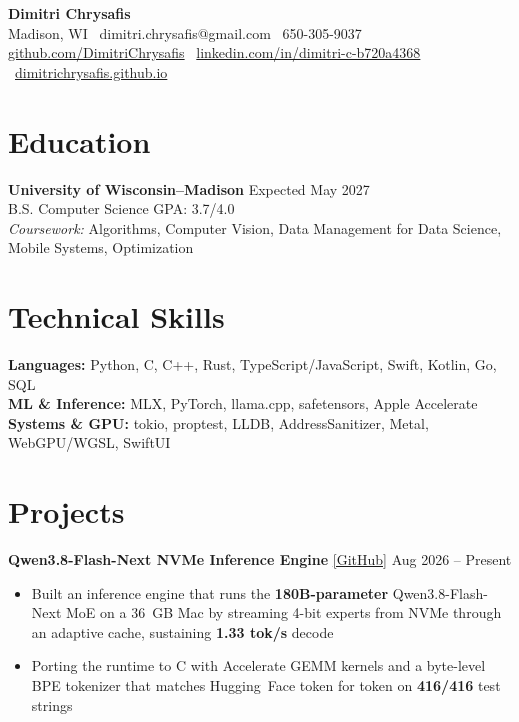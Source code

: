 \documentclass[11pt]{article}
\begin{document}
\pagestyle{empty}

\begin{center}
\textbf{\Large Dimitri Chrysafis}\\[2pt]
Madison, WI \textbullet \ dimitri.chrysafis@gmail.com \textbullet \ 650-305-9037\\
\href{https://github.com/DimitriChrysafis}{github.com/DimitriChrysafis} \textbullet \ \href{https://www.linkedin.com/in/dimitri-c-b720a4368/}{linkedin.com/in/dimitri-c-b720a4368} \textbullet \ \href{https://dimitrichrysafis.github.io/}{dimitrichrysafis.github.io}
\end{center}

\section*{\textcolor{modernblue}{\large Education}}
\textbf{University of Wisconsin–Madison} \hfill \textcolor{experienceblue}{\small Expected May 2027}\\
B.S. Computer Science \hfill GPA: 3.7/4.0\\
\small{\textit{Coursework:} Algorithms, Computer Vision, Data Management for Data Science, Mobile Systems, Optimization}\normalsize

\section*{\textcolor{modernblue}{\large Technical Skills}}
\small{\textbf{Languages:} Python, C, C++, Rust, TypeScript/JavaScript, Swift, Kotlin, Go, SQL\\
\textbf{ML \& Inference:} MLX, PyTorch, llama.cpp, safetensors, Apple Accelerate\\
\textbf{Systems \& GPU:} tokio, proptest, LLDB, AddressSanitizer, Metal, WebGPU/WGSL, SwiftUI}
\normalsize

\section*{\textcolor{modernblue}{\large Projects}}
\noindent\textbf{Qwen3.8-Flash-Next NVMe Inference Engine} \href{https://github.com/DimitriChrysafis/qwen3.8-flash-next}{[GitHub]} \hfill \textcolor{experienceblue}{\small Aug 2026 -- Present}
\begin{itemize}
\item Built an inference engine that runs the \textbf{180B-parameter} Qwen3.8-Flash-Next MoE on a 36~GB Mac by streaming 4-bit experts from NVMe through an adaptive cache, sustaining \textbf{1.33 tok/s} decode
\item Porting the runtime to C with Accelerate GEMM kernels and a byte-level BPE tokenizer that matches Hugging~Face token for token on \textbf{416/416} test strings
\end{itemize}
\end{document}
